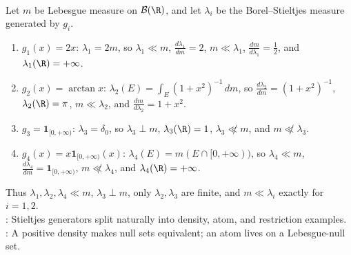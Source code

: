 \begin{example} \label{ex:stieltjes-basic-generators-rn-classification} \\
Let $m$ be Lebesgue measure on $\mathcal{B}(\R)$, and let $\lambda_i$ be the Borel--Stieltjes measure generated by $g_i$.
\begin{enumerate}[label=(\roman*)]
\setlength{\itemsep}{0pt}
\item $g_1(x)=2x$: $\lambda_1=2m$, so $\lambda_1\ll m$, $\frac{d\lambda_1}{dm}=2$, $m\ll\lambda_1$, $\frac{dm}{d\lambda_1}=\frac{1}{2}$, and $\lambda_1(\R)=+\infty$.
\item $g_2(x)=\arctan x$: $\lambda_2(E)=\int_E(1+x^2)^{-1}\,dm$, so $\frac{d\lambda_2}{dm}=(1+x^2)^{-1}$, $\lambda_2(\R)=\pi$, $m\ll\lambda_2$, and $\frac{dm}{d\lambda_2}=1+x^2$.
\item $g_3=\mathbf{1}_{[0,+\infty)}$: $\lambda_3=\delta_0$, so $\lambda_3\perp m$, $\lambda_3(\R)=1$, $\lambda_3\not\ll m$, and $m\not\ll\lambda_3$.
\item $g_4(x)=x\mathbf{1}_{[0,+\infty)}(x)$: $\lambda_4(E)=m(E\cap[0,+\infty))$, so $\lambda_4\ll m$, $\frac{d\lambda_4}{dm}=\mathbf{1}_{[0,+\infty)}$, $m\not\ll\lambda_4$, and $\lambda_4(\R)=+\infty$.
\end{enumerate}
Thus $\lambda_1,\lambda_2,\lambda_4\ll m$, $\lambda_3\perp m$, only $\lambda_2,\lambda_3$ are finite, and $m\ll\lambda_i$ exactly for $i=1,2$.\\
: Stieltjes generators split naturally into density, atom, and restriction examples.\\
: A positive density makes null sets equivalent; an atom lives on a Lebesgue-null set.
\end{example}

